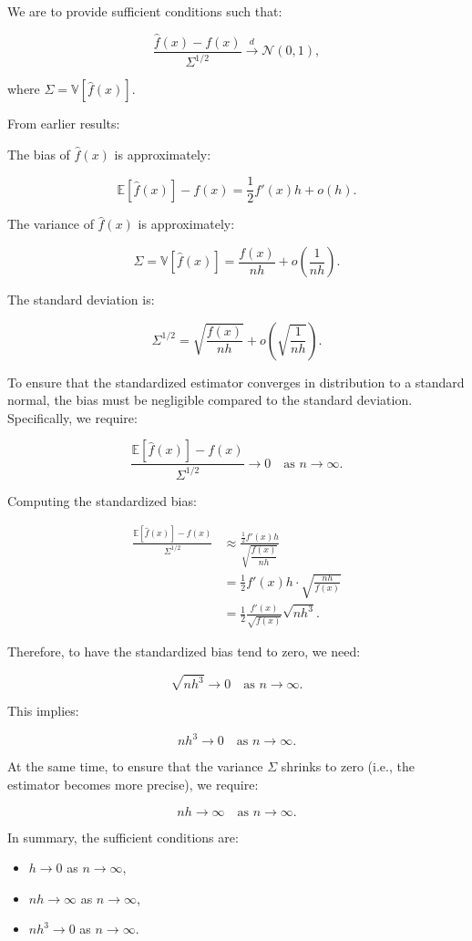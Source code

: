 \documentclass{article}
\begin{document}
We are to provide sufficient conditions such that:

\[
\frac{\hat{f}(x) - f(x)}{\Sigma^{1/2}} \xrightarrow{d} \mathcal{N}(0, 1),
\]

where \(\Sigma = \mathbb{V}[\hat{f}(x)]\).

From earlier results:

The bias of \(\hat{f}(x)\) is approximately:

\[
\mathbb{E}[\hat{f}(x)] - f(x) = \frac{1}{2} f'(x) h + o(h).
\]

The variance of \(\hat{f}(x)\) is approximately:

\[
\Sigma = \mathbb{V}[\hat{f}(x)] = \frac{f(x)}{n h} + o\left( \frac{1}{n h} \right).
\]

The standard deviation is:

\[
\Sigma^{1/2} = \sqrt{\frac{f(x)}{n h}} + o\left( \sqrt{\frac{1}{n h}} \right).
\]

To ensure that the standardized estimator converges in distribution to a standard normal, the bias must be negligible compared to the standard deviation. Specifically, we require:

\[
\frac{\mathbb{E}[\hat{f}(x)] - f(x)}{\Sigma^{1/2}} \to 0 \quad \text{as } n \to \infty.
\]

Computing the standardized bias:

\[
\begin{aligned}
\frac{\mathbb{E}[\hat{f}(x)] - f(x)}{\Sigma^{1/2}} &\approx \frac{\frac{1}{2} f'(x) h}{\sqrt{\dfrac{f(x)}{n h}}} \\
&= \frac{1}{2} f'(x) h \cdot \sqrt{\frac{n h}{f(x)}} \\
&= \frac{1}{2} \frac{f'(x)}{\sqrt{f(x)}} \sqrt{n h^3}.
\end{aligned}
\]

Therefore, to have the standardized bias tend to zero, we need:

\[
\sqrt{n h^3} \to 0 \quad \text{as } n \to \infty.
\]

This implies:

\[
n h^3 \to 0 \quad \text{as } n \to \infty.
\]

At the same time, to ensure that the variance \(\Sigma\) shrinks to zero (i.e., the estimator becomes more precise), we require:

\[
n h \to \infty \quad \text{as } n \to \infty.
\]

In summary, the sufficient conditions are:

\begin{itemize}
    \item \( h \to 0 \) as \( n \to \infty \),
    \item \( n h \to \infty \) as \( n \to \infty \),
    \item \( n h^3 \to 0 \) as \( n \to \infty \).
\end{itemize}
\end{document}
